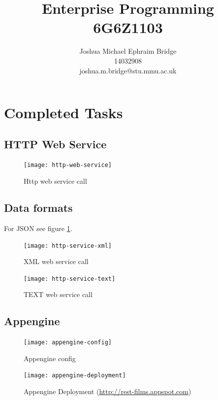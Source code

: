 \documentclass[12pt]{article}
\title{\vspace{1cm}\textbf{Enterprise Programming}\\6G6Z1103}
\author{Joshua Michael Ephraim Bridge\\14032908\\joshua.m.bridge@stu.mmu.ac.uk}
\begin{document}
\maketitle

\tableofcontents

\section{Completed Tasks}
  \subsection{HTTP Web Service}
    \begin{figure}[H]
      \centering
      \texttt{[image: http-web-service]}
      \caption{Http web service call}
      \label{fig:http-web-service}
    \end{figure}

  \subsection{Data formats}
    For JSON see figure \ref{fig:http-web-service}.

    \begin{figure}[H]
      \centering
      \texttt{[image: http-service-xml]}
      \caption{XML web service call}
      \label{fig:http-service-xml}
    \end{figure}

    \begin{figure}[H]
      \centering
      \texttt{[image: http-service-text]}
      \caption{TEXT web service call}
      \label{fig:http-service-text}
    \end{figure}

  \subsection{Appengine}
    \begin{figure}[H]
      \centering
      \texttt{[image: appengine-config]}
      \caption{Appengine config}
      \label{fig:appengine-config}
    \end{figure}

    \begin{figure}[H]
      \centering
      \texttt{[image: appengine-deployment]}
      \caption{Appengine Deployment (\url{http://rest-films.appspot.com})}
      \label{fig:appengine-deployment}
    \end{figure}
\end{document}
